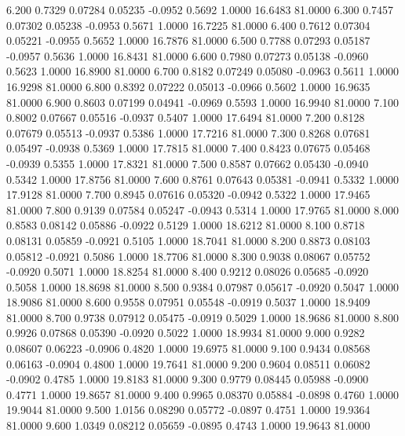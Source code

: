    6.200   0.7329   0.07284   0.05235  -0.0952   0.5692   1.0000  16.6483  81.0000
   6.300   0.7457   0.07302   0.05238  -0.0953   0.5671   1.0000  16.7225  81.0000
   6.400   0.7612   0.07304   0.05221  -0.0955   0.5652   1.0000  16.7876  81.0000
   6.500   0.7788   0.07293   0.05187  -0.0957   0.5636   1.0000  16.8431  81.0000
   6.600   0.7980   0.07273   0.05138  -0.0960   0.5623   1.0000  16.8900  81.0000
   6.700   0.8182   0.07249   0.05080  -0.0963   0.5611   1.0000  16.9298  81.0000
   6.800   0.8392   0.07222   0.05013  -0.0966   0.5602   1.0000  16.9635  81.0000
   6.900   0.8603   0.07199   0.04941  -0.0969   0.5593   1.0000  16.9940  81.0000
   7.100   0.8002   0.07667   0.05516  -0.0937   0.5407   1.0000  17.6494  81.0000
   7.200   0.8128   0.07679   0.05513  -0.0937   0.5386   1.0000  17.7216  81.0000
   7.300   0.8268   0.07681   0.05497  -0.0938   0.5369   1.0000  17.7815  81.0000
   7.400   0.8423   0.07675   0.05468  -0.0939   0.5355   1.0000  17.8321  81.0000
   7.500   0.8587   0.07662   0.05430  -0.0940   0.5342   1.0000  17.8756  81.0000
   7.600   0.8761   0.07643   0.05381  -0.0941   0.5332   1.0000  17.9128  81.0000
   7.700   0.8945   0.07616   0.05320  -0.0942   0.5322   1.0000  17.9465  81.0000
   7.800   0.9139   0.07584   0.05247  -0.0943   0.5314   1.0000  17.9765  81.0000
   8.000   0.8583   0.08142   0.05886  -0.0922   0.5129   1.0000  18.6212  81.0000
   8.100   0.8718   0.08131   0.05859  -0.0921   0.5105   1.0000  18.7041  81.0000
   8.200   0.8873   0.08103   0.05812  -0.0921   0.5086   1.0000  18.7706  81.0000
   8.300   0.9038   0.08067   0.05752  -0.0920   0.5071   1.0000  18.8254  81.0000
   8.400   0.9212   0.08026   0.05685  -0.0920   0.5058   1.0000  18.8698  81.0000
   8.500   0.9384   0.07987   0.05617  -0.0920   0.5047   1.0000  18.9086  81.0000
   8.600   0.9558   0.07951   0.05548  -0.0919   0.5037   1.0000  18.9409  81.0000
   8.700   0.9738   0.07912   0.05475  -0.0919   0.5029   1.0000  18.9686  81.0000
   8.800   0.9926   0.07868   0.05390  -0.0920   0.5022   1.0000  18.9934  81.0000
   9.000   0.9282   0.08607   0.06223  -0.0906   0.4820   1.0000  19.6975  81.0000
   9.100   0.9434   0.08568   0.06163  -0.0904   0.4800   1.0000  19.7641  81.0000
   9.200   0.9604   0.08511   0.06082  -0.0902   0.4785   1.0000  19.8183  81.0000
   9.300   0.9779   0.08445   0.05988  -0.0900   0.4771   1.0000  19.8657  81.0000
   9.400   0.9965   0.08370   0.05884  -0.0898   0.4760   1.0000  19.9044  81.0000
   9.500   1.0156   0.08290   0.05772  -0.0897   0.4751   1.0000  19.9364  81.0000
   9.600   1.0349   0.08212   0.05659  -0.0895   0.4743   1.0000  19.9643  81.0000
